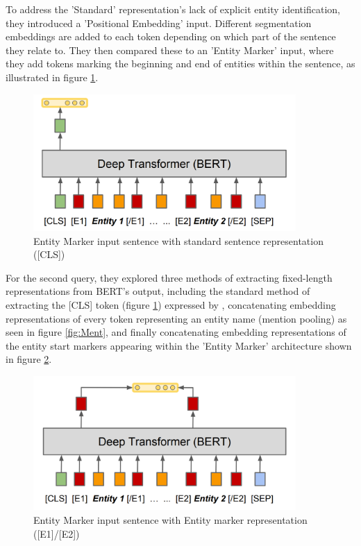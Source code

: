 \documentclass{l4proj}
\begin{document}
To address the 'Standard' representation's lack of explicit entity identification, they introduced a 'Positional Embedding' input. Different segmentation embeddings are added to each token depending on which part of the sentence they relate to. They then compared these to an 'Entity Marker' input, where they add tokens marking the beginning and end of entities within the sentence, as illustrated in figure \ref{fig:EMCLS}. 

\begin{figure}[htb]
    \centering
   \includegraphics[width=10cm]{images/EMCLS.png}
  \caption{Entity Marker input sentence with standard sentence representation ([CLS])}
  \label{fig:EMCLS}
\end{figure}

For the second query, they explored three methods of extracting fixed-length representations from BERT's output, including the standard method of extracting the [CLS] token (figure \ref{fig:EMCLS}) expressed by \cite{BERT}, concatenating embedding representations of every token representing an entity name (mention pooling) as seen in figure \ref{fig:Ment}, and finally concatenating embedding representations of the entity start markers appearing within the 'Entity Marker' architecture shown in figure \ref{fig:EMES}.

\begin{figure}[htb]
    \centering
    \includegraphics[width=10cm]{images/EMES.png}
  \caption{Entity Marker input sentence with Entity marker representation ([E1]/[E2])}
  \label{fig:EMES}
\end{figure}
\end{document}
